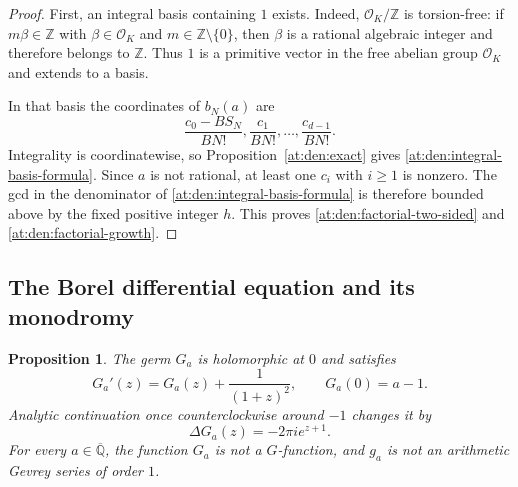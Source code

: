 \documentclass[11pt,a4paper]{article}
\newcommand{\Z}{\mathbb Z}
\newcommand{\Qbar}{\overline{\mathbb Q}}
\newtheorem{proposition}[theorem]{Proposition}
\theoremstyle{definition}
\theoremstyle{remark}
\numberwithin{equation}{section}
\begin{document}
\begin{proof}
First, an integral basis containing $1$ exists.  Indeed,
$\mathcal O_K/\Z$ is torsion-free: if $m\beta\in\Z$ with
$\beta\in\mathcal O_K$ and $m\in\Z\setminus\{0\}$, then $\beta$ is a
rational algebraic integer and therefore belongs to $\Z$.  Thus $1$ is a
primitive vector in the free abelian group $\mathcal O_K$ and extends to a
basis.

In that basis the coordinates of $b_N(a)$ are
\[
 \frac{c_0-BS_N}{BN!},
 \frac{c_1}{BN!},\ldots,\frac{c_{d-1}}{BN!}.
\]
Integrality is coordinatewise, so Proposition~\ref{at:den:exact} gives
\eqref{at:den:integral-basis-formula}.  Since $a$ is not rational, at least
one $c_i$ with $i\geq1$ is nonzero.  The gcd in the denominator of
\eqref{at:den:integral-basis-formula} is therefore bounded above by the fixed
positive integer $h$.  This proves \eqref{at:den:factorial-two-sided} and
\eqref{at:den:factorial-growth}.
\end{proof}

\subsection{The Borel differential equation and its monodromy}

\begin{proposition}\label{at:den:borel-ode}
The germ $G_a$ is holomorphic at $0$ and satisfies
\begin{equation}\label{at:den:inhomogeneous}
 G_a'(z)=G_a(z)+\frac{1}{(1+z)^2},
 \qquad G_a(0)=a-1.
\end{equation}
Analytic continuation once counterclockwise around $-1$ changes it by
\begin{equation}\label{at:den:monodromy}
 \Delta G_a(z)=-2\pi i e^{z+1}.
\end{equation}
For every $a\in\Qbar$, the function $G_a$ is not a $G$-function, and
$g_a$ is not an arithmetic Gevrey series of order $1$.
\end{proposition}
\end{document}
